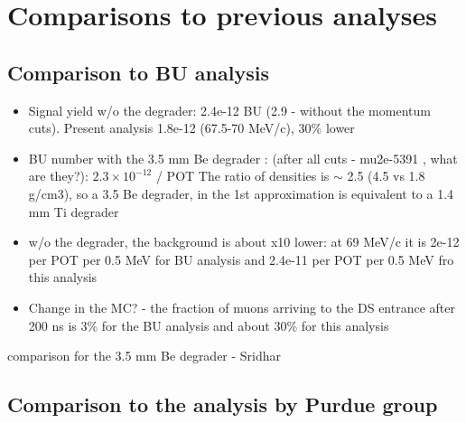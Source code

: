 \section{Comparisons to previous analyses} 

\subsection{Comparison to BU analysis}

\begin{itemize}
\item 
  Signal yield w/o the degrader: 2.4e-12 BU (2.9 - without the momentum cuts).
  Present analysis 1.8e-12 (67.5-70 MeV/c), 30\% lower
\item
  BU number with the 3.5 mm Be degrader : (after all cuts - mu2e-5391 ,
  what are they?): $2.3 \times 10^{-12}$ / POT 
  The ratio of densities is $\sim$ 2.5 (4.5 vs 1.8 g/cm3),
  so a 3.5 Be degrader, in the 1st approximation is equivalent to a 1.4 mm Ti degrader
\item
  w/o the degrader, the background is about x10 lower:
  at 69 MeV/c it is 2e-12 per POT per 0.5 MeV for BU analysis
  and 2.4e-11 per POT per 0.5 MeV fro this analysis
\item
  Change in the MC? - the fraction of muons arriving to the DS entrance after 200 ns
  is 3\% for the BU analysis and about 30\% for this analysis
\end{itemize}


{\red
  comparison for the 3.5 mm Be degrader - Sridhar
}


\subsection{Comparison to the analysis by Purdue group}


